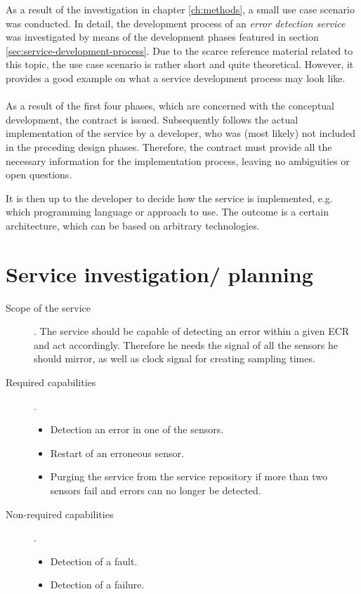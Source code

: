 As a result of the investigation in chapter \ref{ch:methods}, a small use case scenario was conducted. In detail, the development process of an \emph{error detection service} was investigated by means of the development phases featured in section \ref{sec:service-development-process}. Due to the scarce reference material related to this topic, the use case scenario is rather short and quite theoretical. However, it provides a good example on what a service development process may look like.
\\
\\
As a result of the first four phases, which are concerned with the conceptual development, the contract is issued. Subsequently follows the actual implementation of the service by a developer, who was (most likely) not included in the preceding design phases. Therefore, the contract must provide all the necessary information for the implementation process, leaving no ambiguities or open questions.

It is then up to the developer to decide how the service is implemented, e.g. which programming language or approach to use. The outcome is a certain architecture, which can be based on arbitrary technologies. 



\section{Service investigation/ planning}


\begin{description}
\item [Scope of the service].
The service should be capable of detecting an error within a given ECR and act accordingly. Therefore he needs the signal of all the sensors he should mirror, as well as clock signal for creating sampling times.
\item [Required capabilities].
	\begin{itemize}
	\item Detection an error in one of the sensors.
	\item Restart of an erroneous sensor.
	\item Purging the service from the service repository if more than two sensors fail and errors can no longer be detected.
	\end{itemize}
\item [Non-required capabilities].
	\begin{itemize}
	\item Detection of a fault.
	\item Detection of a failure.
	\end{itemize}
\end{description}



